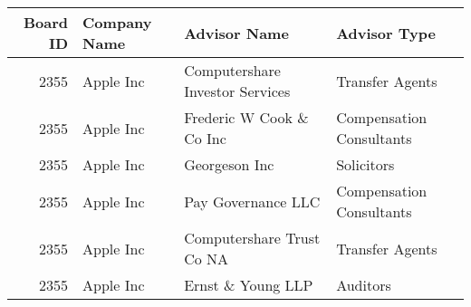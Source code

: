 

\begin{longtable}{ r l l l }\hline\hline
   Board ID &    Company Name &    Advisor Name &    Advisor Type\\ 
\hline\endhead
   2355 &    Apple Inc &    Computershare Investor Services &    Transfer Agents\\ 
   2355 &    Apple Inc &    Frederic W Cook \& Co Inc &    Compensation Consultants\\ 
   2355 &    Apple Inc &    Georgeson Inc &    Solicitors\\ 
   2355 &    Apple Inc &    Pay Governance LLC &    Compensation Consultants\\ 
   2355 &    Apple Inc &    Computershare Trust Co NA &    Transfer Agents\\ 
   2355 &    Apple Inc &    Ernst \& Young LLP &    Auditors\\ 
\hline\hline\end{longtable}

